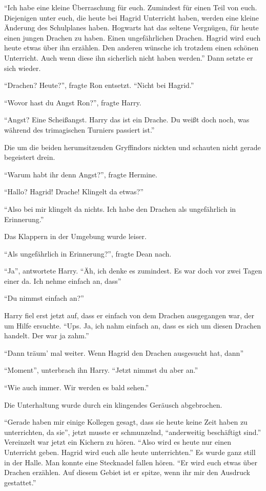 \enquote{Ich habe eine kleine Überraschung für euch. Zumindest für einen Teil von euch. Diejenigen unter euch, die heute bei Hagrid Unterricht haben, werden eine kleine Änderung des Schulplanes haben. Hogwarts hat das seltene Vergnügen, für heute einen jungen Drachen zu haben. Einen ungefährlichen Drachen. Hagrid wird euch heute etwas über ihn erzählen. Den anderen wünsche ich trotzdem einen schönen Unterricht. Auch wenn diese ihn sicherlich nicht haben werden.} Dann setzte er sich wieder.

\enquote{Drachen? Heute?}, fragte Ron entsetzt. \enquote{Nicht bei Hagrid.}

\enquote{Wovor hast du Angst Ron?}, fragte Harry.

\enquote{Angst? Eine Scheißangst. Harry das ist ein Drache. Du weißt doch noch, was während des trimagischen Turniers passiert ist.}

Die um die beiden herumsitzenden Gryffindors nickten und schauten nicht gerade begeistert drein.

\enquote{Warum habt ihr denn Angst?}, fragte Hermine.

\enquote{Hallo? Hagrid! Drache! Klingelt da etwas?}

\enquote{Also bei mir klingelt da nichts. Ich habe den Drachen als ungefährlich in Erinnerung.}

Das Klappern in der Umgebung wurde leiser.

\enquote{Als ungefährlich in Erinnerung?}, fragte Dean nach.

\enquote{Ja}, antwortete Harry. \enquote{Äh, ich denke es zumindest. Es war doch vor zwei Tagen einer da. Ich nehme einfach an, dass\abs}

\enquote{Du nimmst einfach an?}

Harry fiel erst jetzt auf, dass er einfach von dem Drachen ausgegangen war, der um Hilfe ersuchte. \enquote{Ups. Ja, ich nahm einfach an, dass es sich um diesen Drachen handelt. Der war ja zahm.}

\enquote{Dann träum’ mal weiter. Wenn Hagrid den Drachen ausgesucht hat, dann\abs}

\enquote{Moment}, unterbrach ihn Harry. \enquote{Jetzt nimmst du aber an.}

\enquote{Wie auch immer. Wir werden es bald sehen.}

Die Unterhaltung wurde durch ein klingendes Geräusch abgebrochen.

\enquote{Gerade haben mir einige Kollegen gesagt, dass sie heute keine Zeit haben zu unterrichten, da sie}, jetzt musste er schmunzelnd, \enquote{anderweitig beschäftigt sind.} Vereinzelt war jetzt ein Kichern zu hören. \enquote{Also wird es heute nur einen Unterricht geben. Hagrid wird euch alle heute unterrichten.} Es wurde ganz still in der Halle. Man konnte eine Stecknadel fallen hören. \enquote{Er wird euch etwas über Drachen erzählen. Auf diesem Gebiet ist er spitze, wenn ihr mir den Ausdruck gestattet.}

